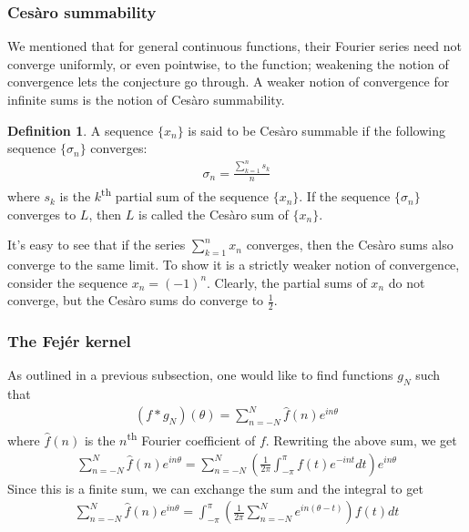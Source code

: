 \documentclass[12pt, titlepage]{article}
\theoremstyle{definition}
\newtheorem{defn}{Definition}[section]
\begin{document}
\subsubsection{Cesàro summability}
We mentioned that for general continuous functions, their Fourier series need not converge uniformly, or even pointwise, to the function; weakening the notion of convergence lets the conjecture go through. A weaker notion of convergence for infinite sums is the notion of Cesàro summability.
\begin{defn}
    A sequence $\{x_n\}$ is said to be Cesàro summable if the following sequence $\{\sigma_n\}$ converges:
    \begin{align*}
        \sigma_n = \frac{\sum_{k=1}^{n} s_k }{n}
    \end{align*}
    where $s_k$ is the $k$\textsuperscript{th} partial sum of the sequence $\{x_n\}$. If the sequence $\{ \sigma_n \}$ converges to $L$, then $L$ is called the Cesàro sum of $\{x_n\}$.
\end{defn}

It's easy to see that if the series $\displaystyle \sum_{k=1}^{n} x_n$ converges, then the Cesàro sums also converge to the same limit. To show it is a strictly weaker notion of convergence, consider the sequence $x_n = (-1)^n$. Clearly, the partial sums of $x_n$ do not converge, but the Cesàro sums do converge to $\frac{1}{2}$.

\subsubsection{The Fejér kernel}
As outlined in a previous subsection, one would like to find functions $g_N$ such that
\begin{align*}
    (f \ast g_N)(\theta) = \sum_{n = -N}^{N} \widehat{f}(n) e^{in\theta}
\end{align*}
where $\widehat{f}(n)$ is the $n$\textsuperscript{th} Fourier coefficient of $f$. Rewriting the above sum, we get
\begin{align*}
    \sum_{n = -N}^{N} \widehat{f}(n) e^{in\theta} = \sum_{n = -N}^{N} \left( \frac{1}{2\pi} \int_{-\pi}^{\pi} f(t) e^{-int} dt \right) e^{in\theta}
\end{align*}
Since this is a finite sum, we can exchange the sum and the integral to get
\begin{align*}
    \sum_{n = -N}^{N} \widehat{f}(n) e^{in\theta} = \int_{-\pi}^{\pi} \left( \frac{1}{2\pi} \sum_{n = -N}^{N} e^{in(\theta - t)} \right) f(t) dt
\end{align*}
\end{document}
